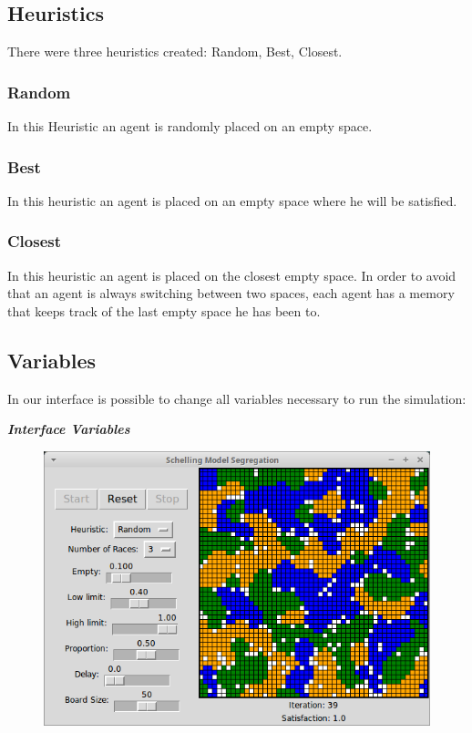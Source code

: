 \documentclass[a4paper,titlepage,11pt]{article}
\begin{document}
\subsection{Heuristics}
There were three heuristics created: Random, Best, Closest.

\subsubsection{Random}
In this Heuristic an agent is randomly placed on an empty space.

\subsubsection{Best}
In this heuristic an agent is placed on an empty space where he will be satisfied.

\subsubsection{Closest}
In this heuristic an agent is placed on the closest empty space. In order to avoid that an agent is always switching between two spaces, each agent has a memory that keeps track of the last empty space he has been to.

\subsection{Variables}
In our interface is possible to change all variables necessary to run the simulation:

\textit{ \textbf{Interface Variables} }

\begin{figure}[h]
    \centering
    \includegraphics[scale=0.50]{img/interface.png}
\end{figure}
\end{document}
